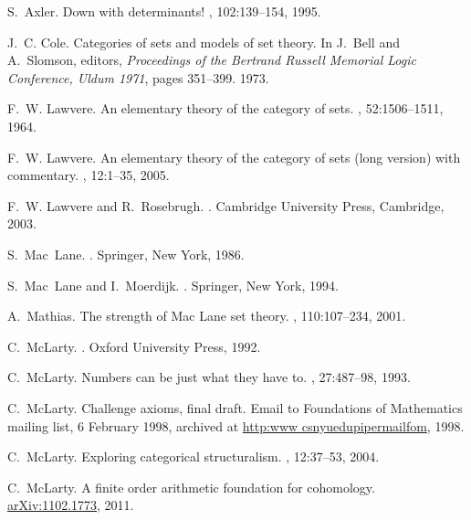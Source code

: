 \documentclass[12pt]{article}
\begin{document}
\begin{thebibliography}{10}

S.~Axler.
\newblock Down with determinants!
, 102:139--154, 1995.

J.~C. Cole.
\newblock Categories of sets and models of set theory.
\newblock In J.~Bell and A.~Slomson, editors, {\em Proceedings of the Bertrand
  Russell Memorial Logic Conference, Uldum 1971}, pages 351--399. 1973.

F.~W. Lawvere.
\newblock An elementary theory of the category of sets.
,
  52:1506--1511, 1964.

F.~W. Lawvere.
\newblock An elementary theory of the category of sets (long version) with
  commentary.
, 12:1--35,
  2005.

F.~W. Lawvere and R.~Rosebrugh.
.
\newblock Cambridge University Press, Cambridge, 2003.

S.~Mac~Lane.
.
\newblock Springer, New York, 1986.

S.~Mac~Lane and I.~Moerdijk.
.
\newblock Springer, New York, 1994.

A.~Mathias.
\newblock The strength of {M}ac {L}ane set theory.
, 110:107--234, 2001.

C.~Mc{L}arty.
.
\newblock Oxford University Press, 1992.

C.~Mc{L}arty.
\newblock Numbers can be just what they have to.
, 27:487--98, 1993.

C.~Mc{L}arty.
\newblock Challenge axioms, final draft.
\newblock Email to Foundations of Mathematics mailing list, 6 February 1998,
  archived at \href{http://www.cs.nyu.edu/pipermail/fom}{http:\dblslsh www\dt
  cs\dt nyu\dt edu\slsh pipermail\slsh fom}, 1998.

C.~Mc{L}arty.
\newblock Exploring categorical structuralism.
, 12:37--53, 2004.

C.~Mc{L}arty.
\newblock A finite order arithmetic foundation for cohomology.
\newblock \href{http://arxiv.org/abs/1102.1773}{arXiv:1102.1773}, 2011.


\end{thebibliography}
\end{document}

